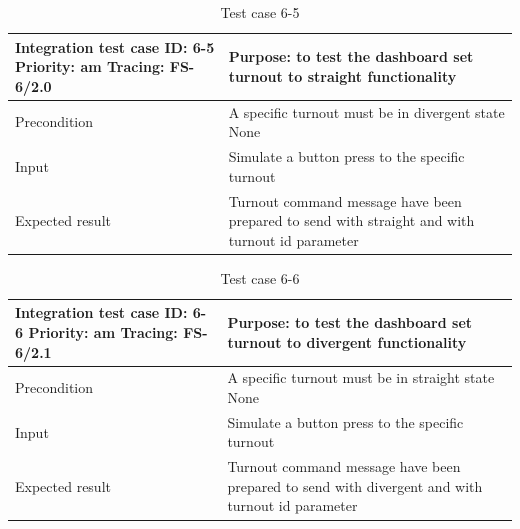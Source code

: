 \begin{table}[H]
	\caption{Test case 6-5}
	\label{table:TCase-FS6-5}
	\begin{center}
		\renewcommand{\arraystretch}{1.8}
		\begin{tabu} 
			to 0.9 \textwidth
			{  X[0.4, c] X[c] }
			\toprule
			Integration test case ID: 6-5 \newline Priority: am \newline Tracing: FS-6/2.0 & Purpose: to test the dashboard set turnout to straight functionality  \\ \midrule
			Precondition                                                                   & A specific turnout must be in divergent state None                                                                                                     \\
			Input                                                                          & Simulate a button press to the specific turnout                                \\
			Expected result                                                                & Turnout command message have been prepared to send with straight and with turnout id parameter \\ \bottomrule
		\end{tabu}
	\end{center}
\end{table}

\begin{table}[H]
	\caption{Test case 6-6}
	\label{table:TCase-FS6-6}
	\begin{center}
		\renewcommand{\arraystretch}{1.8}
		\begin{tabu} 
			to 0.9 \textwidth
			{  X[0.4, c] X[c] }
			\toprule
			Integration test case ID: 6-6 \newline Priority: am \newline Tracing: FS-6/2.1 & Purpose: to test the dashboard set turnout to divergent functionality  \\ \midrule
			Precondition                                                                   & A specific turnout must be in straight state None                                                                                                     \\
			Input                                                                          & Simulate a button press to the specific turnout                                \\
			Expected result                                                                & Turnout command message have been prepared to send with divergent and with turnout id parameter \\ \bottomrule
		\end{tabu}
	\end{center}
\end{table}

